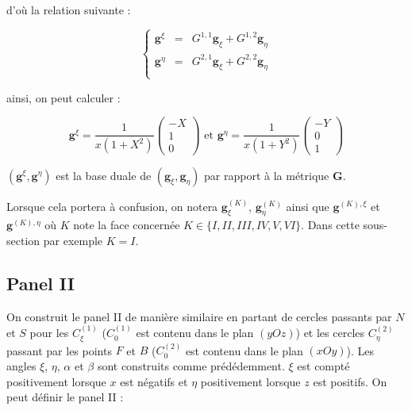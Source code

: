 d'où la relation suivante :

\begin{equation}
\left\lbrace
\begin{array}{rcl}
\mathbf{g}^{\xi} & = & G^{1,1} \mathbf{g}_{\xi} + G^{1,2} \mathbf{g}_{\eta} \\
\mathbf{g}^{\eta} & = & G^{2,1} \mathbf{g}_{\xi} + G^{2,2} \mathbf{g}_{\eta} \\
\end{array}
\right.
\end{equation}

ainsi, on peut calculer :

\begin{equation}
\mathbf{g}^{\xi} = \dfrac{1}{x(1+X^2)}\begin{pmatrix}
-X \\ 1 \\ 0
\end{pmatrix} \text{ et } \mathbf{g}^{\eta} = \dfrac{1}{x(1+Y^2)}\begin{pmatrix}
-Y \\ 0 \\ 1
\end{pmatrix}
\label{eq: base duale I}
\end{equation}

$( \mathbf{g}^{\xi}, \mathbf{g}^{\eta})$ est la base duale de $(\mathbf{g}_{\xi}, \mathbf{g}_{\eta})$ par rapport à la métrique $\mathbf{G}$.

\begin{remarque}
Lorsque cela portera à confusion, on notera $\mathbf{g}_{\xi}^{(K)}$, $\mathbf{g}_{\eta}^{(K)}$ ainsi que $\mathbf{g}^{(K),\xi}$ et $\mathbf{g}^{(K),\eta}$ où $K$ note la face concernée $K \in \lbrace I, II, III, IV, V, VI \rbrace$. Dans cette sous-section par exemple $K=I$.   
\end{remarque}






\subsection{Panel II}

On construit le panel II de manière similaire en partant de cercles passants par $N$ et $S$ pour les $C_{\xi}^{(1)}$ ($C_{0}^{(1)}$ est contenu dans le plan $(yOz)$) et les cercles $C_{\eta}^{(2)}$ passant par les points $F$ et $B$ ($C_{0}^{(2)}$ est contenu dans le plan $(xOy)$). Les angles $\xi$, $\eta$, $\alpha$ et $\beta$ sont construits comme prédédemment.  $\xi$ est compté positivement lorsque $x$ est négatifs et $\eta$ positivement lorsque $z$ est positifs.
On peut définir le panel II :

